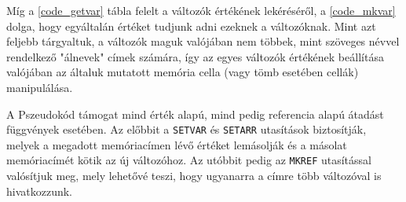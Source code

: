Míg a \ref{code_getvar} tábla felelt a változók értékének lekéréséről, a \ref{code_mkvar} dolga, hogy egyáltalán értéket tudjunk adni ezeknek a változóknak. Mint azt feljebb tárgyaltuk, a változók maguk valójában nem többek, mint szöveges névvel rendelkező "álnevek" címek számára, így az egyes változók értékének beállítása valójában az általuk mutatott memória cella (vagy tömb esetében cellák) manipulálása.

A Pszeudokód támogat mind érték alapú, mind pedig referencia alapú átadást függvények esetében. Az előbbit a \texttt{SETVAR} és \texttt{SETARR} utasítások biztosítják, melyek a megadott memóriacímen lévő értéket lemásolják és a másolat memóriacímét kötik az új változóhoz. Az utóbbit pedig az \texttt{MKREF} utasítással valósítjuk meg, mely lehetővé teszi, hogy ugyanarra a címre több változóval is hivatkozzunk.


